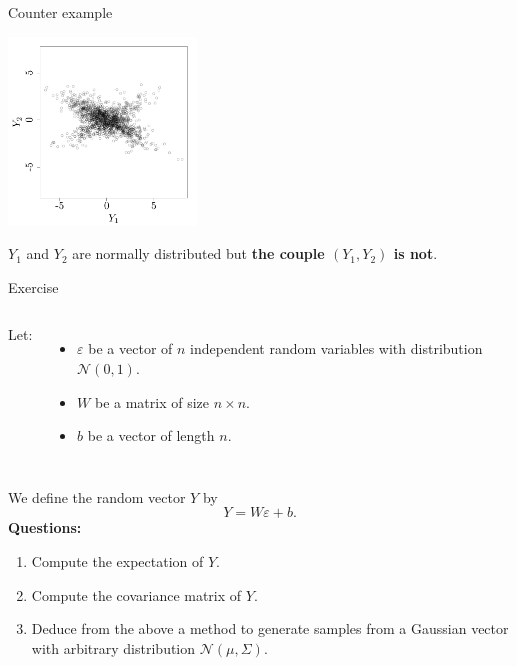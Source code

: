 \documentclass{beamer}
\begin{document}
\begin{frame}{}
\begin{exampleblock}{Counter example}
\begin{center}
 \includegraphics[height=5cm]{figures/R/MVN_gaussvec3}
\end{center}
$Y_1$ and $Y_2$ are normally distributed but \textbf{the couple $(Y_1,Y_2)$ is not}.
\end{exampleblock}
\end{frame}


\begin{frame}{}
\begin{exampleblock}{Exercise}
\begin{columns}[t]
\column{5mm}
Let:
\column{9cm}
\vspace{-5.5mm}
\begin{itemize}
	\item $\varepsilon$ be a vector of $n$ independent random variables with distribution $\mathcal{N}(0,1)$. 
	\item $W$ be a matrix of size $n \times n$.
	\item $b$ be a vector of length $n$.
\end{itemize}
\end{columns}
\vspace{5mm}
We define the random vector $Y$ by 
$$ Y = W \varepsilon + b.$$
\textbf{Questions:}
\begin{enumerate}
	\item Compute the expectation of $Y$.
	\item Compute the covariance matrix of $Y$.
	\item Deduce from the above a method to generate samples from a Gaussian vector with arbitrary distribution $\mathcal{N}(\mu,\Sigma)$.
\end{enumerate}
\end{exampleblock}
\end{frame}
\end{document}
